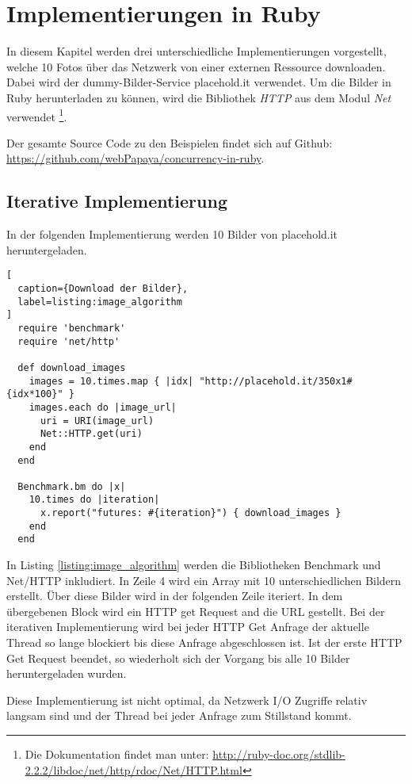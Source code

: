 \section{Implementierungen in Ruby}
\label{section:implementation}

In diesem Kapitel werden drei unterschiedliche Implementierungen vorgestellt, welche 10 Fotos über das Netzwerk von einer externen Ressource downloaden. Dabei wird der dummy-Bilder-Service placehold.it verwendet. Um die Bilder in Ruby herunterladen zu können, wird die Bibliothek \emph{HTTP} aus dem Modul \emph{Net} verwendet \footnote{Die Dokumentation findet man unter: \url{http://ruby-doc.org/stdlib-2.2.2/libdoc/net/http/rdoc/Net/HTTP.html}}.

Der gesamte Source Code zu den Beispielen findet sich auf Github: \url{https://github.com/webPapaya/concurrency-in-ruby}.


\subsection{Iterative Implementierung}

In der folgenden Implementierung werden 10 Bilder von placehold.it heruntergeladen.

\begin{lstlisting}[
  caption={Download der Bilder},
  label=listing:image_algorithm
]
  require 'benchmark'
  require 'net/http'

  def download_images
    images = 10.times.map { |idx| "http://placehold.it/350x1#{idx*100}" }
    images.each do |image_url|
      uri = URI(image_url)
      Net::HTTP.get(uri)
    end
  end

  Benchmark.bm do |x|
    10.times do |iteration|
      x.report("futures: #{iteration}") { download_images }
    end
  end
\end{lstlisting}

In Listing \ref{listing:image_algorithm} werden die Bibliotheken Benchmark und Net/HTTP inkludiert. In Zeile 4 wird ein Array mit 10 unterschiedlichen Bildern erstellt. Über diese Bilder wird in der folgenden Zeile iteriert.  In dem übergebenen Block wird ein HTTP get Request and die URL gestellt. Bei der iterativen Implementierung wird bei jeder HTTP Get Anfrage der aktuelle Thread so lange blockiert bis diese Anfrage abgeschlossen ist. Ist der erste HTTP Get Request beendet, so wiederholt sich der Vorgang bis alle 10 Bilder heruntergeladen wurden. 

Diese Implementierung ist nicht optimal, da Netzwerk I/O Zugriffe relativ langsam sind und der Thread bei jeder Anfrage zum Stillstand kommt.

